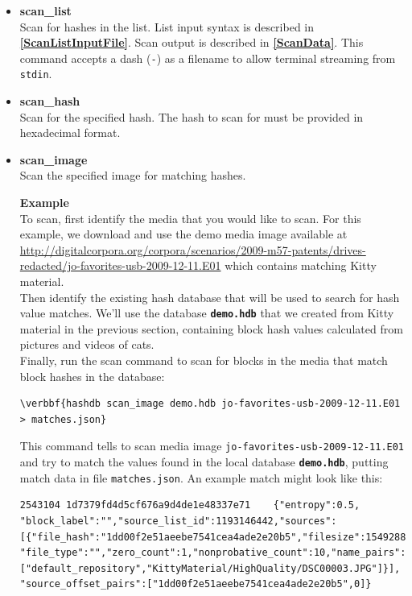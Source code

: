 \documentclass[11pt,fleqn]{article} %
\begin{document}
\begin{itemize}
\item \textbf{scan\_list}\\
Scan for hashes in the list. List input syntax is described in \textbf{\autoref{ScanListInputFile}}. Scan output is described in \textbf{\autoref{ScanData}}. This command accepts a dash (\verb+-+) as a filename to allow terminal streaming from \verb+stdin+.\\
\item \textbf{scan\_hash}\\
Scan for the specified hash. The hash to scan for must be provided in hexadecimal format.
\item \textbf{scan\_image}\\
Scan the specified image for matching hashes.

\textbf{Example}\\
To scan, first identify the media that you would like to scan. For this example, we download and use the demo media image available at \url{ http://digitalcorpora.org/corpora/scenarios/2009-m57-patents/drives-redacted/jo-favorites-usb-2009-12-11.E01} which contains matching Kitty material.\\

Then identify the existing hash database that will be used to search for hash value matches. We'll use the database \texttt{\textbf{demo.hdb}} that we created from Kitty material in the previous section, containing block hash values calculated from pictures and videos of cats.\\

Finally, run the \hdb scan command to scan for blocks in the media that match block hashes in the database:
\begin{Verbatim}[commandchars=\\\{\}]
\verbbf{hashdb scan_image demo.hdb jo-favorites-usb-2009-12-11.E01 > matches.json}
\end{Verbatim}
This command tells \hdb to scan media image \verb+jo-favorites-usb-2009-12-11.E01+ and try to match the values found in the local database \texttt{\textbf{demo.hdb}}, putting match data in file \verb+matches.json+.  An example match might look like this:

\begingroup
\footnotesize
\begin{Verbatim}[fontfamily=courier]
2543104	1d7379fd4d5cf676a9d4de1e48337e71	{"entropy":0.5,
"block_label":"","source_list_id":1193146442,"sources":
[{"file_hash":"1dd00f2e51aeebe7541cea4ade2e20b5","filesize":1549288,
"file_type":"","zero_count":1,"nonprobative_count":10,"name_pairs":
["default_repository","KittyMaterial/HighQuality/DSC00003.JPG"]}],
"source_offset_pairs":["1dd00f2e51aeebe7541cea4ade2e20b5",0]}
\end{Verbatim}
\endgroup


\end{itemize}
\end{document}
